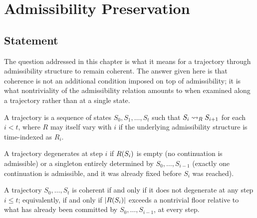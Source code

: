 \chapter{Admissibility Preservation}
\label{ch:preservation}

\section{Statement}

The question addressed in this chapter is what it means for a
trajectory through admissibility structure to remain coherent. The
answer given here is that coherence is not an additional condition
imposed on top of admissibility; it is what nontriviality of the
admissibility relation amounts to when examined along a trajectory
rather than at a single state.

\begin{definition}[Trajectory]
A trajectory is a sequence of states $S_0, S_1, \dots, S_t$ such that
$S_i \rightsquigarrow_{R} S_{i+1}$ for each $i < t$, where $R$ may itself vary with
$i$ if the underlying admissibility structure is time-indexed as $R_i$.
\end{definition}

\begin{definition}[Degeneracy]
A trajectory degenerates at step $i$ if $R(S_i)$ is empty (no
continuation is admissible) or a singleton entirely determined by
$S_0, \dots, S_{i-1}$ (exactly one continuation is admissible, and it
was already fixed before $S_i$ was reached).
\end{definition}

\begin{theorem}
\label{thm:preservation}
A trajectory $S_0, \dots, S_t$ is coherent if and only if it does not
degenerate at any step $i \le t$; equivalently, if and only if
$|R(S_i)|$ exceeds a nontrivial floor relative to what has already
been committed by $S_0, \dots, S_{i-1}$, at every step.
\end{theorem}

